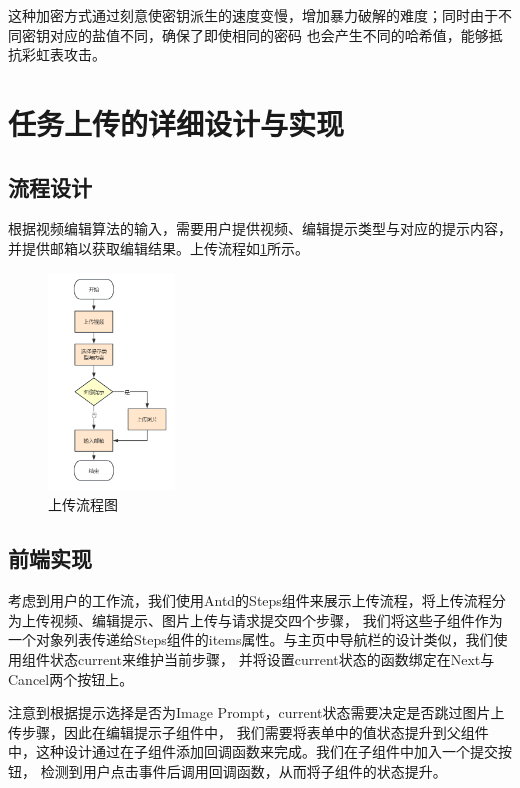 这种加密方式通过刻意使密钥派生的速度变慢，增加暴力破解的难度；同时由于不同密钥对应的盐值不同，确保了即使相同的密码
也会产生不同的哈希值，能够抵抗彩虹表攻击。

\section{任务上传的详细设计与实现}

\subsection{流程设计}

根据视频编辑算法的输入，需要用户提供视频、编辑提示类型与对应的提示内容，并提供邮箱以获取编辑结果。上传流程如\ref{fig:upload-process}所示。
\begin{figure}[ht]
    \centering
    \includegraphics[width=0.3\textwidth]{source/img/edit_process.png}
    \caption{上传流程图}
    \label{fig:upload-process}
\end{figure}

\subsection{前端实现}

考虑到用户的工作流，我们使用Antd的Steps组件来展示上传流程，将上传流程分为上传视频、编辑提示、图片上传与请求提交四个步骤，
我们将这些子组件作为一个对象列表传递给Steps组件的items属性。与主页中导航栏的设计类似，我们使用组件状态current来维护当前步骤，
并将设置current状态的函数绑定在Next与Cancel两个按钮上。

注意到根据提示选择是否为Image Prompt，current状态需要决定是否跳过图片上传步骤，因此在编辑提示子组件中，
我们需要将表单中的值状态提升到父组件中，这种设计通过在子组件添加回调函数来完成。我们在子组件中加入一个提交按钮，
检测到用户点击事件后调用回调函数，从而将子组件的状态提升。

